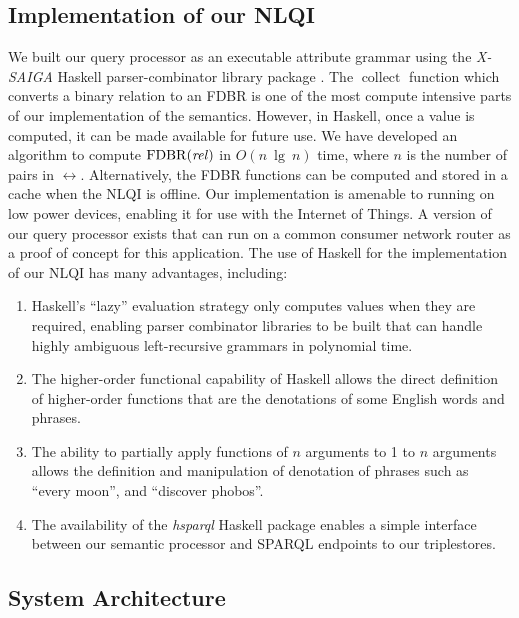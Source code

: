 \documentclass[../main.tex]{subfiles}
\begin{document}
\begin{refsection}
\section{Implementation of our NLQI}
\label{webist2019journal:implementation}
We built our query processor as an executable attribute grammar using the {\em X-SAIGA} Haskell parser-combinator library package \cite{xsaiga}.
The $\operatorname{collect}$ function which converts a binary relation to an FDBR is one of the most
compute intensive parts of our implementation of the semantics. However, in Haskell, once a value is
computed, it can be made available for future use. We have developed an algorithm to compute
$\operatorname{FDBR}({\operatorname{\mathit{rel}}})$ in $O(n\ \operatorname{lg}\ n)$ time, where $n$ is the number of pairs in $\rel$.
Alternatively, the FDBR functions can be computed and stored in a cache when the NLQI is offline.
Our implementation is amenable to running on low power devices, enabling it for use with the Internet of Things. A version of our query processor exists that can run on a common consumer network router as a proof of concept for this application.
The use of Haskell for the implementation of our NLQI has many advantages, including:
\begin{enumerate}
	\setlength\itemsep{0em}
	\item Haskell's ``lazy'' evaluation strategy only computes values when they are required, enabling parser combinator
	libraries to be built that can handle highly ambiguous left-recursive grammars in polynomial time.
	\item The higher-order functional capability of Haskell allows the direct definition of higher-order
	functions that are the denotations of some English words and phrases.
	\item The ability to partially apply functions of $n$ arguments to 1 to $n$ arguments allows the
	definition and manipulation of denotation of phrases such as ``every moon'', and ``discover
	phobos''.
	\item The availability of the \textit{hsparql} \cite{hsparql} Haskell package enables a simple interface between our semantic processor and SPARQL endpoints to our triplestores.
\end{enumerate}



\subsection{System Architecture}
\label{webist2019journal:architecture}


\end{refsection}
\end{document}
